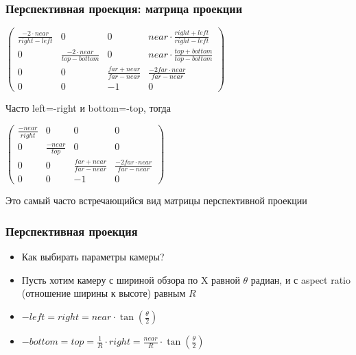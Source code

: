\documentclass{beamer}
\begin{document}
\begin{frame}[fragile]
\frametitle{Перспективная проекция: матрица проекции}
\begin{center}
\begin{math}
\begin{pmatrix}
\frac{-2\cdot near}{right - left} & 0 & 0 & near \cdot \frac{right + left}{right - left} \\
0 & \frac{-2\cdot near}{top - bottom} & 0 & near \cdot \frac{top + bottom}{top - bottom} \\
0 & 0 & \frac{far + near}{far - near} & \frac{-2 far \cdot near}{far - near} \\
0 & 0 & -1 & 0
\end{pmatrix}
\end{math}
\end{center}

\pause
Часто left=-right и bottom=-top, тогда

\begin{center}
\begin{math}
\begin{pmatrix}
\frac{-near}{right} & 0 & 0 & 0 \\
0 & \frac{-near}{top} & 0 & 0 \\
0 & 0 & \frac{far + near}{far - near} & \frac{-2 far \cdot near}{far - near} \\
0 & 0 & -1 & 0
\end{pmatrix}
\end{math}
\end{center}
Это самый часто встречающийся вид матрицы перспективной проекции
\end{frame}

\begin{frame}[fragile]
\frametitle{Перспективная проекция}
\begin{itemize}
\item Как выбирать параметры камеры?
\pause
\item Пусть хотим камеру с шириной обзора по X равной \begin{math}\theta\end{math} радиан, и с aspect ratio (отношение ширины к высоте) равным \begin{math}R\end{math}
\pause
\item \begin{math}-left=right=near \cdot \tan\left(\frac{\theta}{2}\right)\end{math}
\item \begin{math}-bottom=top=\frac{1}{R} \cdot right = \frac{near}{R} \cdot \tan\left(\frac{\theta}{2}\right)\end{math}
\end{itemize}
\end{frame}
\end{document}
